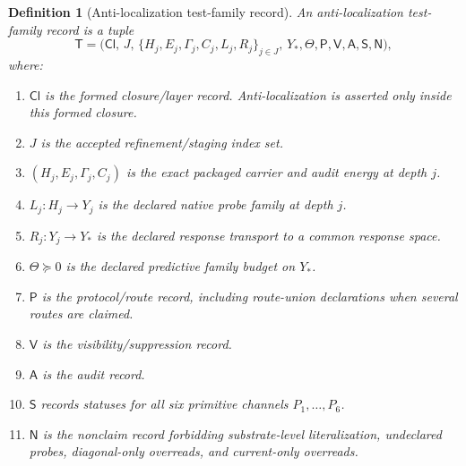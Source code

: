 \documentclass[11pt]{article}
\newtheorem{definition}{Definition}
\begin{document}
\begin{definition}[Anti-localization test-family record]
An anti-localization test-family record is a tuple
\[
\mathsf T
=
\bigl(
\mathsf{Cl},\,J,\,\{H_j,E_j,\Gamma_j,C_j,L_j,R_j\}_{j\in J},\,
Y_*,\Theta,\mathsf P,\mathsf V,\mathsf A,\mathsf S,\mathsf N
\bigr),
\]
where:
\begin{enumerate}[label=(T\arabic*)]
\item $\mathsf{Cl}$ is the formed closure/layer record.  Anti-localization is asserted only inside this formed closure.
\item $J$ is the accepted refinement/staging index set.
\item $(H_j,E_j,\Gamma_j,C_j)$ is the exact packaged carrier and audit energy at depth $j$.
\item $L_j:H_j\to Y_j$ is the declared native probe family at depth $j$.
\item $R_j:Y_j\to Y_*$ is the declared response transport to a common response space.
\item $\Theta\succeq0$ is the declared predictive family budget on $Y_*$.
\item $\mathsf P$ is the protocol/route record, including route-union declarations when several routes are claimed.
\item $\mathsf V$ is the visibility/suppression record.
\item $\mathsf A$ is the audit record.
\item $\mathsf S$ records statuses for all six primitive channels $P_1,\dots,P_6$.
\item $\mathsf N$ is the nonclaim record forbidding substrate-level literalization, undeclared probes, diagonal-only overreads, and current-only overreads.
\end{enumerate}
\end{definition}
\end{document}
